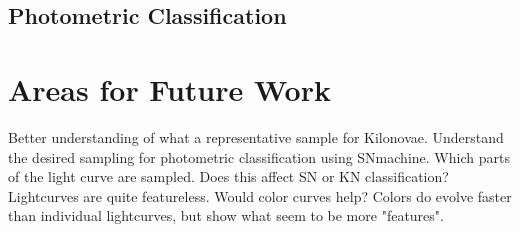 \documentclass[11pt]{article}
\begin{document}
\subsection{Photometric Classification}

\section{Areas for Future Work} %
Better understanding of what a representative sample for Kilonovae. 
Understand the desired sampling for photometric classification using SNmachine. Which parts of the light curve are sampled. Does this affect SN or KN classification?
Lightcurves are quite featureless. Would color curves help? Colors do evolve faster than individual lightcurves, but show what seem to be more "features". 
\end{document}
